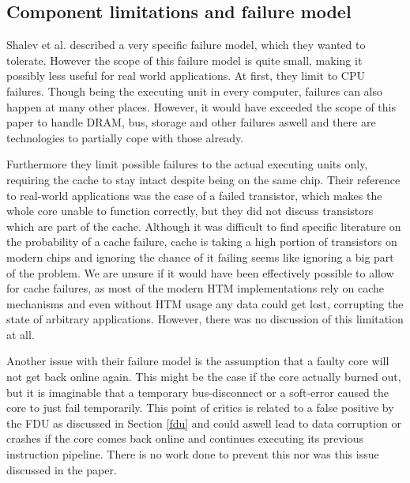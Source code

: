 \documentclass[a4paper,10pt,twoside]{article}
\begin{document}
\subsection{Component limitations and failure model} \label{cachefailure}
Shalev et al. described a very specific failure model, which they wanted to tolerate. However the scope of this failure model is quite small, making it possibly less useful for real world applications. At first, they limit to CPU failures. Though being the executing unit in every computer, failures can also happen at many other places. However, it would have exceeded the scope of this paper to handle DRAM, bus, storage and other failures aswell and there are technologies to partially cope with those already.

Furthermore they limit possible failures to the actual executing units only, requiring the cache to stay intact despite being on the same chip. Their reference to real-world applications was the case of a failed transistor, which makes the whole core unable to function correctly, but they did not discuss transistors which are part of the cache. Although it was difficult to find specific literature on the probability of a cache failure, cache is taking a high portion of transistors on modern chips and ignoring the chance of it failing seems like ignoring a big part of the problem. We are unsure if it would have been effectively possible to allow for cache failures, as most of the modern HTM implementations rely on cache mechanisms and even without HTM usage any data could get lost, corrupting the state of arbitrary applications. However, there was no discussion of this limitation at all.

Another issue with their failure model is the assumption that a faulty core will not get back online again. This might be the case if the core actually burned out, but it is imaginable that a temporary bus-disconnect or a soft-error caused the core to just fail temporarily. This point of critics is related to a false positive by the FDU as discussed in Section \ref{fdu} and could aswell lead to data corruption or crashes if the core comes back online and continues executing its previous instruction pipeline. There is no work done to prevent this nor was this issue discussed in the paper.
\end{document}
